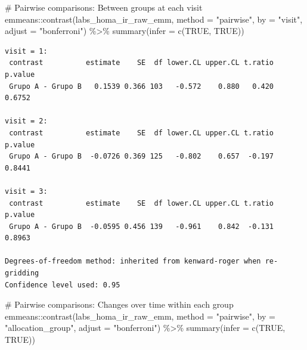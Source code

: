 \documentclass[
  letterpaper,
  DIV=11,
  numbers=noendperiod]{scrartcl}
\newenvironment{Shaded}{\begin{snugshade}}{\end{snugshade}}
\newcommand{\AttributeTok}[1]{\textcolor[rgb]{0.40,0.45,0.13}{#1}}
\newcommand{\CommentTok}[1]{\textcolor[rgb]{0.37,0.37,0.37}{#1}}
\newcommand{\ConstantTok}[1]{\textcolor[rgb]{0.56,0.35,0.01}{#1}}
\newcommand{\FunctionTok}[1]{\textcolor[rgb]{0.28,0.35,0.67}{#1}}
\newcommand{\NormalTok}[1]{\textcolor[rgb]{0.00,0.23,0.31}{#1}}
\newcommand{\SpecialCharTok}[1]{\textcolor[rgb]{0.37,0.37,0.37}{#1}}
\newcommand{\StringTok}[1]{\textcolor[rgb]{0.13,0.47,0.30}{#1}}
\begin{document}
\begin{Shaded}
\begin{Highlighting}[]
\CommentTok{\# Pairwise comparisons: Between groups at each visit}
\NormalTok{emmeans}\SpecialCharTok{::}\FunctionTok{contrast}\NormalTok{(labs\_homa\_ir\_raw\_emm, }\AttributeTok{method =} \StringTok{"pairwise"}\NormalTok{, }\AttributeTok{by =} \StringTok{"visit"}\NormalTok{, }\AttributeTok{adjust =} \StringTok{"bonferroni"}\NormalTok{) }\SpecialCharTok{\%\textgreater{}\%} \FunctionTok{summary}\NormalTok{(}\AttributeTok{infer =} \FunctionTok{c}\NormalTok{(}\ConstantTok{TRUE}\NormalTok{, }\ConstantTok{TRUE}\NormalTok{))}
\end{Highlighting}
\end{Shaded}

\begin{verbatim}
visit = 1:
 contrast          estimate    SE  df lower.CL upper.CL t.ratio p.value
 Grupo A - Grupo B   0.1539 0.366 103   -0.572    0.880   0.420  0.6752

visit = 2:
 contrast          estimate    SE  df lower.CL upper.CL t.ratio p.value
 Grupo A - Grupo B  -0.0726 0.369 125   -0.802    0.657  -0.197  0.8441

visit = 3:
 contrast          estimate    SE  df lower.CL upper.CL t.ratio p.value
 Grupo A - Grupo B  -0.0595 0.456 139   -0.961    0.842  -0.131  0.8963

Degrees-of-freedom method: inherited from kenward-roger when re-gridding 
Confidence level used: 0.95 
\end{verbatim}

\begin{Shaded}
\begin{Highlighting}[]
\CommentTok{\# Pairwise comparisons: Changes over time within each group}
\NormalTok{emmeans}\SpecialCharTok{::}\FunctionTok{contrast}\NormalTok{(labs\_homa\_ir\_raw\_emm, }\AttributeTok{method =} \StringTok{"pairwise"}\NormalTok{, }\AttributeTok{by =} \StringTok{"allocation\_group"}\NormalTok{, }\AttributeTok{adjust =} \StringTok{"bonferroni"}\NormalTok{) }\SpecialCharTok{\%\textgreater{}\%} \FunctionTok{summary}\NormalTok{(}\AttributeTok{infer =} \FunctionTok{c}\NormalTok{(}\ConstantTok{TRUE}\NormalTok{, }\ConstantTok{TRUE}\NormalTok{))}
\end{Highlighting}
\end{Shaded}
\end{document}

